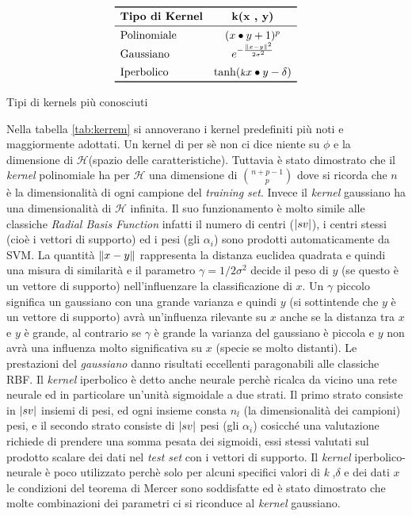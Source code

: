 \begin{table}[htp]
\centering
\[ 
\begin{array}{lc} 
\toprule
\text{\textbf{Tipo di Kernel}} & \text{\textbf{k(x , y)}}  \\
\midrule  
\text{Polinomiale}  &  (x \bullet y +1)^p \\
\text{Gaussiano}  &  e^{-\frac{\norma{x-y}^{2}}{2\sigma^2}}\\[1ex]
\text{Iperbolico}  & \tanh(\text{{\footnotesize {\textsl k}}}x \bullet y - \delta) \\

\bottomrule
\end{array}
\]
 \caption[Kernels più noti]{Tipi di kernels più conosciuti}
\label{tab:kerrem}
\end{table}  

Nella tabella \ref{tab:kerrem} si annoverano i kernel predefiniti più noti e maggiormente adottati. Un kernel di per sè non ci dice niente su $\phi$ e la dimensione di $\mathcal{H}$(spazio delle caratteristiche). Tuttavia è stato dimostrato che il \textit{kernel} polinomiale ha per  $\mathcal{H}$ una dimensione di $\binom{n+p-1}{p}$ dove si ricorda che $n$ è la dimensionalità di ogni campione del \textit{training set}. Invece il \textit{kernel} gaussiano ha una dimensionalità di $\mathcal{H}$ infinita. Il suo funzionamento è molto simile alle classiche \textit{Radial Basis Function} infatti  il numero di centri ($\lvert sv\rvert$), i centri stessi (cioè i vettori di supporto) ed i pesi (gli $\alpha_i$) sono prodotti automaticamente da \ac{SVM}. La quantità $\lVert x-y\rVert$ rappresenta la distanza euclidea quadrata e quindi una misura di similarità e il parametro $\gamma = 1/2\sigma^2$ decide il peso di $y$ (se questo è un vettore di supporto) nell'influenzare la classificazione di $x$. Un $\gamma$ piccolo significa un gaussiano con una grande varianza e quindi $y$ (si sottintende che $y$ è un vettore di supporto) avrà un'influenza rilevante su $x$ anche se la distanza tra $x$ e $y$ è grande, al contrario se $\gamma$ è grande la varianza del gaussiano è piccola e $y$ non avrà una influenza molto significativa su $x$ (specie se molto distanti). Le prestazioni del \textit{gaussiano} danno risultati eccellenti paragonabili alle classiche RBF.  Il \textit{kernel} iperbolico è detto anche neurale perchè ricalca da vicino una rete neurale ed in particolare un'unità sigmoidale a due strati. Il primo strato consiste in $\lvert sv\rvert$ insiemi di pesi, ed ogni insieme consta $n_l$ (la dimensionalità dei campioni) pesi, e il secondo strato consiste di $\lvert sv\rvert$ pesi (gli $\alpha_i$) cosicché una valutazione richiede di prendere una somma pesata dei sigmoidi, essi stessi valutati sul prodotto scalare dei dati nel \textit{test set} con i vettori di supporto. Il \textit{kernel} iperbolico-neurale è poco utilizzato perchè solo per alcuni specifici valori di {\footnotesize {\textsl k}} ,$\delta$ e dei dati $x$ le condizioni del teorema di Mercer sono soddisfatte ed è stato dimostrato che molte combinazioni dei parametri ci si riconduce al \textit{kernel} gaussiano.\\
